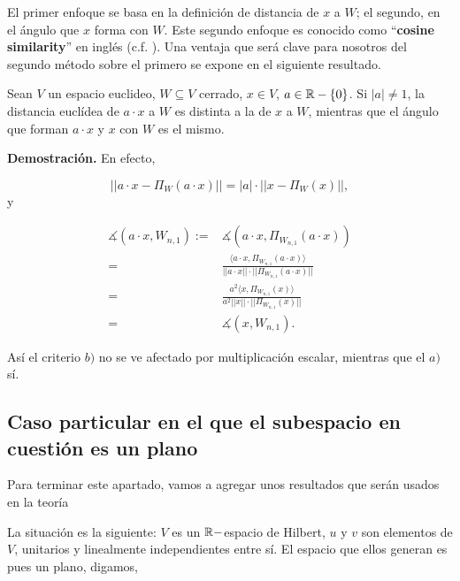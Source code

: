El primer enfoque se basa en la definición de distancia de $x$
a $W$; el segundo, en el ángulo que $x$ forma con $W$. Este segundo
enfoque es conocido como ``\textbf{cosine similarity}'' en
inglés (c.f. ). Una ventaja que será clave
para nosotros del segundo método sobre el primero se
expone en el siguiente resultado.


\begin{prop}
\label{prop: angulo se conserva bajo mult. esc.}
Sean $V$ un espacio euclideo, $W \subseteq V$ cerrado, $x \in V$,
$a \in \mathbb{R} - \{ 0 \}$. Si $|a| \neq 1$, la distancia euclídea 
de $a \cdot x$ a $W$ es distinta
a la de $x$ a $W$, mientras que el ángulo que forman $a \cdot x$ y $x$
con $W$ es el mismo.
\end{prop}
\noindent
\textbf{Demostración.}
En efecto, 

\[
|| a \cdot x - \Pi_{W}(a \cdot x) || = |a| \cdot || x - \Pi_{W}(x) ||, 
\]
y

\begin{align*}
\measuredangle (a \cdot x, W_{n,1}):=& \measuredangle(a \cdot x, \Pi_{W_{n,1}}(a \cdot x)) \\
= & \frac{\langle a \cdot x , \Pi_{W_{n,1}}(a \cdot x) \rangle}{|| a \cdot x || \cdot 
|| \Pi_{W_{n,1}}(a \cdot x)  ||} \\
= & \frac{a^{2}  \langle   x , \Pi_{W_{n,1}}(x) \rangle}{a^{2} ||  x || \cdot 
|| \Pi_{W_{n,1}}( x)  ||}  \\
= & \measuredangle (x, W_{n,1}).
\end{align*}


\QEDB
\vspace{0.2cm}

Así el criterio $b)$ no se ve afectado por multiplicación escalar,
mientras que el $a)$ sí.
 

\subsection{Caso particular en el que el subespacio en cuestión es un plano}
\label{ap: Caso particular en el que el subespacio en cuestión es un plano}

Para terminar este apartado, vamos a
agregar unos resultados que serán usados en la teoría


La situación es la siguiente: $V$ es un $\mathbb{R}-$espacio
de Hilbert, $u$ y $v$ son elementos de $V$,
unitarios y linealmente
independientes entre sí. El espacio que ellos generan
es pues un plano, digamos,


